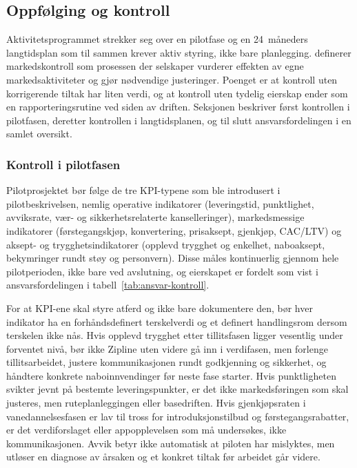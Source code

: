 \subsection{Oppfølging og kontroll}
\label{subsec:oppfolging}

Aktivitetsprogrammet strekker seg over en pilotfase og en 24~måneders
langtidsplan som til sammen krever aktiv styring, ikke bare planlegging.
\textcite[697]{kotlerkeller2016} definerer markedskontroll som prosessen
der selskaper vurderer effekten av egne markedsaktiviteter og gjør
nødvendige justeringer. Poenget er at kontroll uten korrigerende tiltak
har liten verdi, og at kontroll uten tydelig eierskap ender som en
rapporteringsrutine ved siden av driften. Seksjonen beskriver først
kontrollen i pilotfasen, deretter kontrollen i langtidsplanen, og til
slutt ansvarsfordelingen i en samlet oversikt.

\subsubsection{Kontroll i pilotfasen}

Pilotprosjektet bør følge de tre KPI-typene som ble introdusert i
pilotbeskrivelsen, nemlig operative indikatorer (leveringstid, punktlighet,
avviksrate, vær- og sikkerhetsrelaterte kanselleringer), markedsmessige
indikatorer (førstegangskjøp, konvertering, prisaksept, gjenkjøp,
CAC/LTV) og aksept- og trygghetsindikatorer (opplevd trygghet og
enkelhet, naboaksept, bekymringer rundt støy og personvern). Disse måles
kontinuerlig gjennom hele pilotperioden, ikke bare ved avslutning, og
eierskapet er fordelt som vist i ansvarsfordelingen i
tabell~\ref{tab:ansvar-kontroll}.

For at KPI-ene skal styre atferd og ikke bare dokumentere den, bør hver
indikator ha en forhåndsdefinert terskelverdi og et definert
handlingsrom dersom terskelen ikke nås. Hvis opplevd trygghet etter
tillitsfasen ligger vesentlig under forventet nivå, bør ikke Zipline
uten videre gå inn i verdifasen, men forlenge tillitsarbeidet, justere
kommunikasjonen rundt godkjenning og sikkerhet, og håndtere konkrete
naboinnvendinger før neste fase starter. Hvis punktligheten svikter
jevnt på bestemte leveringspunkter, er det ikke markedsføringen som skal
justeres, men ruteplanleggingen eller basedriften. Hvis gjenkjøpsraten i
vanedannelsesfasen er lav til tross for introduksjonstilbud og
førstegangsrabatter, er det verdiforslaget eller appopplevelsen som må
undersøkes, ikke kommunikasjonen. Avvik betyr ikke automatisk at piloten
har mislyktes, men utløser en diagnose av årsaken og et konkret tiltak
før arbeidet går videre.

